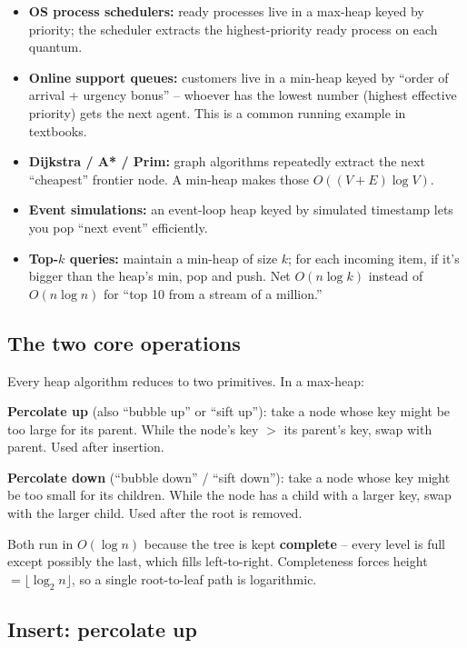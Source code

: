 \documentclass[11pt]{article}
\begin{document}
\begin{itemize}[leftmargin=*]
    \item \textbf{OS process schedulers:} ready processes live in a max-heap keyed by priority; the scheduler extracts the highest-priority ready process on each quantum.
    \item \textbf{Online support queues:} customers live in a min-heap keyed by ``order of arrival + urgency bonus'' -- whoever has the lowest number (highest effective priority) gets the next agent. This is a common running example in textbooks.
    \item \textbf{Dijkstra / A* / Prim:} graph algorithms repeatedly extract the next ``cheapest'' frontier node. A min-heap makes those $O((V+E) \log V)$.
    \item \textbf{Event simulations:} an event-loop heap keyed by simulated timestamp lets you pop ``next event'' efficiently.
    \item \textbf{Top-$k$ queries:} maintain a min-heap of size $k$; for each incoming item, if it's bigger than the heap's min, pop and push. Net $O(n \log k)$ instead of $O(n \log n)$ for ``top 10 from a stream of a million.''
\end{itemize}

\subsection*{The two core operations}

Every heap algorithm reduces to two primitives. In a max-heap:

\begin{defnbox}
\textbf{Percolate up} (also ``bubble up'' or ``sift up''): take a node whose key might be too large for its parent. While the node's key $>$ its parent's key, swap with parent. Used after insertion.

\textbf{Percolate down} (``bubble down'' / ``sift down''): take a node whose key might be too small for its children. While the node has a child with a larger key, swap with the larger child. Used after the root is removed.
\end{defnbox}

Both run in $O(\log n)$ because the tree is kept \textbf{complete} -- every level is full except possibly the last, which fills left-to-right. Completeness forces height $= \lfloor \log_2 n \rfloor$, so a single root-to-leaf path is logarithmic.

\subsection*{Insert: percolate up}
\end{document}
